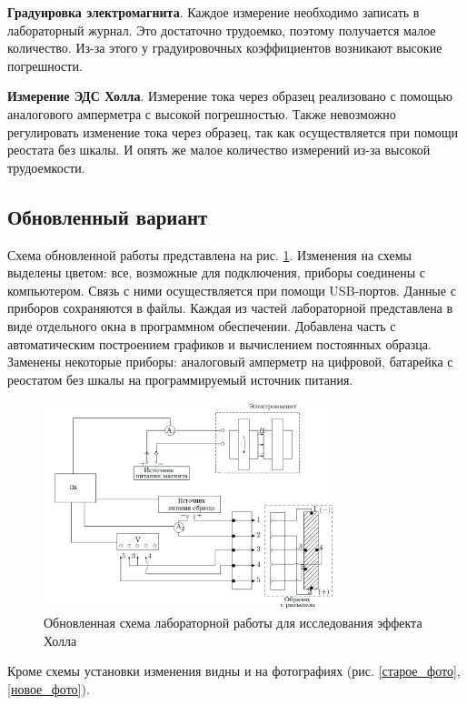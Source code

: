 \documentclass[a4paper,12pt]{article} %
\begin{document}
\textbf{Градуировка электромагнита}. Каждое измерение необходимо записать в лабораторный журнал. Это достаточно трудоемко, поэтому получается малое количество. Из-за этого у градуировочных коэффициентов возникают высокие погрешности. 

\textbf{Измерение ЭДС Холла}. Измерение тока через образец реализовано с помощью аналогового амперметра с высокой погрешностью. Также невозможно регулировать изменение тока через образец, так как осуществляется при помощи реостата без шкалы. И опять же малое количество измерений из-за высокой трудоемкости.



\subsection*{Обновленный вариант}
Схема обновленной работы представлена на рис. \ref{новая}. Изменения на схемы выделены цветом: все, возможные для подключения, приборы соединены с компьютером. Связь с ними осуществляется при помощи USB-портов. Данные с приборов сохраняются в файлы. Каждая из частей лабораторной представлена в виде отдельного окна в программном обеспечении. Добавлена часть с автоматическим построением графиков и вычислением постоянных образца. Заменены некоторые приборы: аналоговый амперметр на цифровой, батарейка с реостатом без шкалы на программируемый источник питания.

\begin{figure}[h!]
\begin{center}
\includegraphics[width=0.76\textwidth]{Установка}
\caption{Обновленная схема лабораторной работы для исследования эффекта Холла} \label{новая}
\end{center}
\end{figure}

Кроме схемы установки изменения видны и на фотографиях (рис. \ref{старое_фото}, \ref{новое_фото}).
\end{document}
